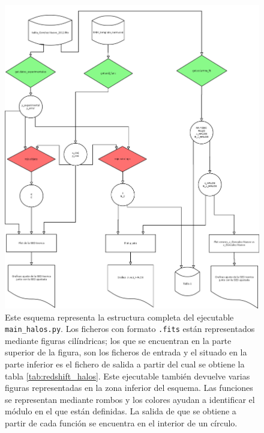 \begin{figure}[!htp]
    \begin{center}
         \includegraphics[width=16cm]{Apendices/codigo/Diagrama_p1.png}
    \end{center}
    \vspace{-3mm}
    \caption{Este esquema representa la estructura completa del ejecutable \texttt{main\_halos.py}. Los ficheros con formato \texttt{.fits} están representados mediante figuras cilíndricas; los que se encuentran en la parte superior de la figura, son los ficheros de entrada y el situado en la parte inferior es el fichero de salida a partir del cual se obtiene la tabla \ref{tab:redshift_halos}. Este ejecutable también devuelve varias figuras representadas en la zona inferior del esquema. Las funciones se representan mediante rombos y los colores ayudan a identificar el módulo en el que están definidas. La salida de que se obtiene a partir de cada función se encuentra en el interior de un círculo. }  
    \label{diagrama_flujo_main_halos}
\end{figure}

\newpage


